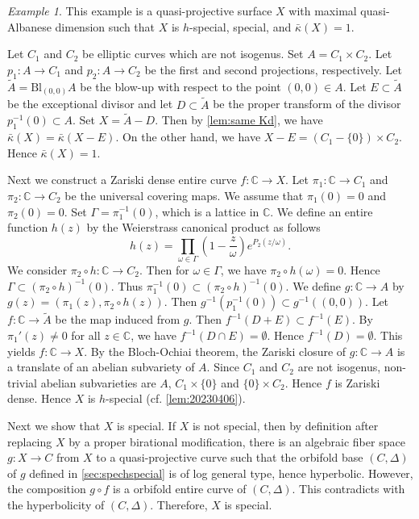 \documentclass[11pt,english]{smfart}
\theoremstyle{plain}
\theoremstyle{definition}
\theoremstyle{remark}
\newtheorem{example}[thm]{Example}
\numberwithin{equation}{subsection}
\theoremstyle{plain}
\begin{document}
\begin{example}\label{example:20221105}
	This example is a quasi-projective surface $X$ with maximal quasi-Albanese dimension such that $X$ is $h$-special, special, and $\bar{\kappa}(X)=1$.
	
	Let $C_1$ and $C_2$ be elliptic curves which are not isogenus.
	Set $A=C_1\times C_2$.
	Let $p_1:A\to C_1$ and $p_2:A\to C_2$ be the first and second projections, respectively.
	Let $\widetilde{A}=\mathrm{Bl}_{(0,0)}A$ be the blow-up with respect to the point $(0,0)\in A$.
	Let $E\subset \widetilde{A}$ be the exceptional divisor and let $D\subset \widetilde{A}$ be the proper transform of the divisor $p_1^{-1}(0)\subset A$.
	Set $X=\widetilde{A}-D$.
	Then by \cref{lem:same Kd}, we have $\bar{\kappa}(X)=\bar{\kappa}(X-E)$.
	On the other hand, we have $X-E=(C_1-\{0\})\times C_2$.
	Hence $\bar{\kappa}(X)=1$.
	
	Next we construct a Zariski dense entire curve $f:\mathbb C\to X$.
	Let $\pi_1:\mathbb C\to C_1$ and $\pi_2:\mathbb C\to C_2$ be the universal covering maps.
	We assume that $\pi_1(0)=0$ and $\pi_2(0)=0$.
	Set $\Gamma=\pi_1^{-1}(0)$, which is a lattice in $\mathbb C$.
	We define an entire function $h(z)$ by the Weierstrass canonical product as follows
	$$
	h(z)=\prod_{\omega\in \Gamma}\left( 1-\frac{z}{\omega}\right)e^{P_2(z/\omega)}.
	$$
	We consider $\pi_2\circ h:\mathbb C\to C_2$.
	Then for $\omega\in \Gamma$, we have $\pi_2\circ h(\omega)=0$.
	Hence $\Gamma\subset (\pi_2\circ h)^{-1}(0)$.
	Thus $\pi_1^{-1}(0)\subset (\pi_2\circ h)^{-1}(0)$.
	We define $g:\mathbb C\to A$ by $g(z)=(\pi_1(z),\pi_2\circ h(z))$.
	Then $g^{-1}(p_1^{-1}(0))\subset g^{-1}((0,0))$.
	Let $f:\mathbb C\to \widetilde{A}$ be the map induced from $g$.
	Then $f^{-1}(D+E)\subset f^{-1}(E)$.
	By $\pi_1'(z)\not=0$ for all $z\in \mathbb C$, we have $f^{-1}(D\cap E)=\emptyset$.
	Hence $f^{-1}(D)=\emptyset$.
	This yields $f:\mathbb C\to X$.
	By the Bloch-Ochiai theorem, the Zariski closure of $g:\mathbb C\to A$ is a translate of an abelian subvariety of $A$.
	Since $C_1$ and $C_2$ are not isogenus, non-trivial abelian subvarieties are $A$, $C_1\times\{0\}$ and $\{0\}\times C_2$.
	Hence $f$ is Zariski dense. 
	Hence $X$ is $h$-special (cf. \cref{lem:20230406}).
	
	Next we show that $X$ is special.
	If $X$ is not special, then  by definition after replacing $X$ by a proper birational modification, there is an algebraic fiber space $g:X\to C$ from $X$ to a  quasi-projective curve such that the orbifold base $(C,\Delta)$ of $g$ defined in \cref{sec:spechspecial} is of log general type, hence hyperbolic.  However, the composition $g\circ f$ is a orbifold entire curve of  $(C,\Delta)$. This contradicts with the hyperbolicity of $(C,\Delta)$.  Therefore, $X$ is special. \end{example}
\end{document}
